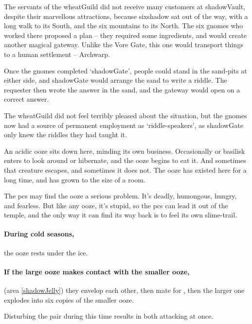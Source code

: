 \begin{multicols}{2}
\begin{exampletext}
  The servants of the \gls{wheatGuild} did not receive many customers at \gls{shadowVault}, despite their marvellous attractions, because \gls{sixshadow} sat out of the way, with a long walk to its South, and the six mountains to its North.
  The six gnomes who worked there proposed a plan -- they required some \glspl{ingredient}, and would create another magical gateway.
  Unlike the Vore Gate, this one would transport things to a human settlement -- Archwarp.

  Once the gnomes completed `\gls{shadowGate}', people could stand in the sand-pits at either side, and \gls{shadowGate}  would arrange the sand to write a riddle.
  The requester then wrote the answer in the sand, and the gateway would open on a correct answer.

  The \gls{wheatGuild} did not feel terribly pleased about the situation, but the gnomes now had a source of permanent employment as `riddle-speakers', as \gls{shadowGate} only knew the riddles they had taught it.
\end{exampletext}

An acidic ooze sits down here, minding its own business.
Occasionally  or \gls{basilisk} enters to look around or hibernate, and the ooze begins to eat it.
And sometimes that creature escapes, and sometimes it does not.
The ooze has existed here for a long time, and has grown to the size of a room.

\uncommonlyLargeJelly

The \glspl{pc} may find the ooze a serious problem.
It's deadly, humongous, hungry, and fearless.
But like any ooze, it's stupid, so the \glspl{pc} can lead it out of the temple, and the only way it can find its way back is to feel its own slime-trail.

\paragraph{During cold seasons,}
the ooze rests under the ice.

\paragraph{If the large ooze makes contact with the smaller ooze,}
(area \vref{shadowJelly})
they envelop each other, then mate for , then the larger one explodes into six copies of the smaller ooze.

Disturbing the pair during this time results in  both attacking at once.


\end{multicols}
